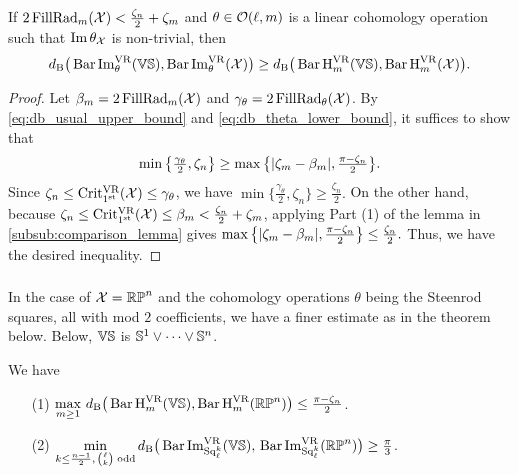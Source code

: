 \medskip\proposition
If $2\firstdeath{m}{\cX} < \tfrac{\zeta_n}{2}+\zeta_\degp$ and $\theta \in \cO(\ell, \degp)$ is a linear cohomology operation such that $\img \theta_\cX$ is non-trivial, then
\[\db\big(\thetabarc{\VS}, \thetabarc{\cX}\big) \geq \db\big(\Hbarc[\field]{\degp}{\VS}, \Hbarc[\field]{\degp}{\cX}\big).\]

\begin{proof}
    Let $\beta_m = 2\firstdeath{m}{\cX}$ and $\gamma_\theta = 2\firstdeath{\theta}{\cX}$.
    By \cref{eq:db_usual_upper_bound} and \cref{eq:db_theta_lower_bound}, it suffices to show that
    \[
    \min\big\{\tfrac{\gamma_\theta}{2}, \zeta_n\big\} \geq \max\big\{|\zeta_\degp - \beta_\degp|, \tfrac{\pi - \zeta_n}{2}\big\}.
    \]
    Since \(\zeta_n \leq \crit(\cX) \leq \gamma_\theta\), we have
    \(
    \min\big\{\tfrac{\gamma_\theta}{2}, \zeta_n\big\} \geq \tfrac{\zeta_n}{2}.
    \)
    On the other hand, because \(\zeta_n \leq \crit(\cX) \leq \beta_\degp < \tfrac{\zeta_n}{2} + \zeta_\degp\), applying Part (1) of the lemma in \cref{subsub:comparison_lemma} gives
    \(
    \max\big\{|\zeta_\degp - \beta_\degp|, \tfrac{\pi - \zeta_n}{2}\big\} \leq \tfrac{\zeta_n}{2}.
    \)
    Thus, we have the desired inequality.
\end{proof}

\subsubsection{}

In the case of $\cX = \rp^n$ and the cohomology operations $\theta$ being the Steenrod squares, all with mod $2$ coefficients, we have a finer estimate as in the theorem below.
Below, $\VS$ is $\bS^1\vee\dots\vee \bS^n$.

\medskip\theorem
We have
\begin{itemize}
	\item[(1)] $\displaystyle \max_{\degp\geq 1}\, \db\big(\Hbarc{\degp}{\VS}, \Hbarc{\degp}{\rp^n}\big)\leq \tfrac{\pi - \zeta_n}{2}$.
	\smallskip
    \item[(2)] $\displaystyle \min_{%
    k \leq \frac{n-1}{2},\, \binom{\ell}{k}\text{ odd}} \db\big(\sqbarcl{k}{\ell}{\VS},\, \sqbarcl{k}{\ell}{\rp^n}\big)\geq \tfrac{\pi}{3}$. %
\end{itemize}

